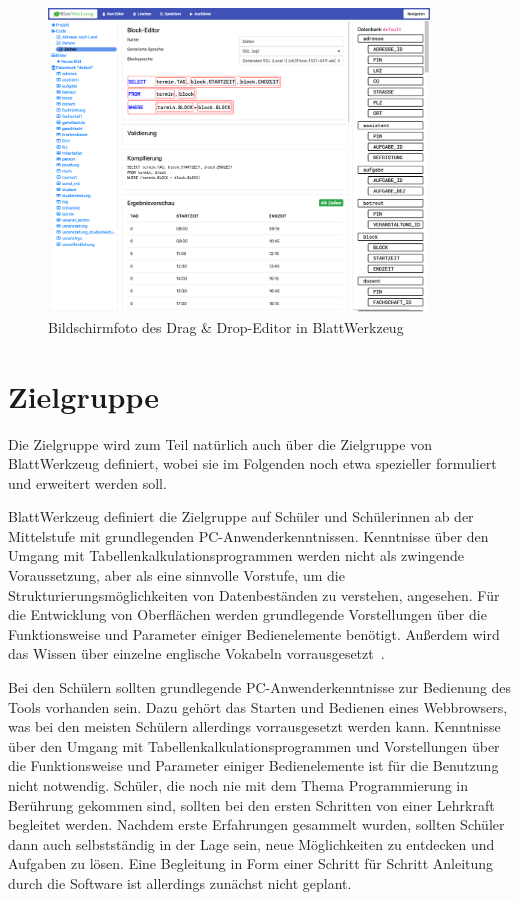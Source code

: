 \begin{figure}
    \centering
    \includegraphics[width=0.9\textwidth]{gfx/requirements-existing-draganddrop.png}
    \caption{Bildschirmfoto des Drag \& Drop-Editor in BlattWerkzeug}
    \label{fig:requirements:existing:draganddrop}
\end{figure}

\section{Zielgruppe}
\label{sec:requirements:target}

Die Zielgruppe wird zum Teil natürlich auch über die Zielgruppe von BlattWerkzeug definiert, wobei sie im Folgenden noch etwa spezieller formuliert und erweitert werden soll.

BlattWerkzeug definiert die Zielgruppe auf Schüler und Schülerinnen ab der Mittelstufe mit grundlegenden PC-Anwenderkenntnissen. Kenntnisse über den Umgang mit Tabellenkalkulationsprogrammen werden nicht als zwingende Voraussetzung, aber als eine sinnvolle Vorstufe, um die Strukturierungsmöglichkeiten von Datenbeständen zu verstehen, angesehen. Für die Entwicklung von Oberflächen werden grundlegende Vorstellungen über die Funktionsweise und Parameter einiger Bedienelemente benötigt. Außerdem wird das Wissen über einzelne englische Vokabeln vorrausgesetzt~\cite[22-23]{riemer2016}.

Bei den Schülern sollten grundlegende PC-Anwenderkenntnisse zur Bedienung des Tools vorhanden sein. Dazu gehört das Starten und Bedienen eines Webbrowsers, was bei den meisten Schülern allerdings vorrausgesetzt werden kann. Kenntnisse über den Umgang mit Tabellenkalkulationsprogrammen und Vorstellungen über die Funktionsweise und Parameter einiger Bedienelemente ist für die Benutzung nicht notwendig. Schüler, die noch nie mit dem Thema Programmierung in Berührung gekommen sind, sollten bei den ersten Schritten von einer Lehrkraft begleitet werden. Nachdem erste Erfahrungen gesammelt wurden, sollten Schüler dann auch selbstständig in der Lage sein, neue Möglichkeiten zu entdecken und Aufgaben zu lösen. Eine Begleitung in Form einer Schritt für Schritt Anleitung durch die Software ist allerdings zunächst nicht geplant.

